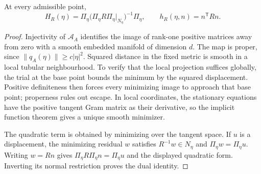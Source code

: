 \begin{lemma}\label{lem:normal-restriction}
At every admissible point,
\begin{equation}\label{eq:normal-restriction}
 H_R(\eta)=\Pi_\eta
   \big(\Pi_\eta R\Pi_\eta|_{N_\eta}\big)^{-1}\Pi_\eta,
 \qquad h_R(\eta,n)=n^{\mathsf T}Rn.
\end{equation}
\end{lemma}
\begin{proof}
Injectivity of $\mathcal A_A$ identifies the image of rank-one positive matrices away from zero with a smooth embedded manifold of dimension $d$. The map is proper, since $\|q_A(\eta)\|\ge c|\eta|^2$. Squared distance in the fixed metric is smooth in a local tubular neighbourhood. To verify that the local projection suffices globally, the trial at the base point bounds the minimum by the squared displacement. Positive definiteness then forces every minimizing image to approach that base point; properness rules out escape. In local coordinates, the stationary equations have the positive tangent Gram matrix as their derivative, so the implicit function theorem gives a unique smooth minimizer.

The quadratic term is obtained by minimizing over the tangent space. If $u$ is a displacement, the minimizing residual $w$ satisfies $R^{-1}w\in N_\eta$ and $\Pi_\eta w=\Pi_\eta u$. Writing $w=Rn$ gives
$\Pi_\eta R\Pi_\eta n=\Pi_\eta u$ and the displayed quadratic form. Inverting its normal restriction proves the dual identity.
\end{proof}

